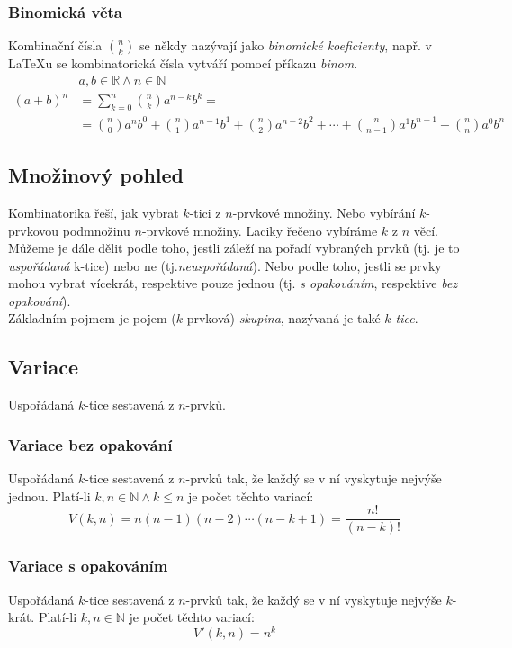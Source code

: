 \documentclass[12pt]{article}
\begin{document}
\subsubsection{Binomická věta}
\label{sec:binom_veta}
Kombinační čísla $\binom{n}{k}$ se někdy nazývají jako \emph{binomické koeficienty}, např. v \LaTeX u se kombinatorická čísla vytváří pomocí příkazu \emph{binom}.
\begin{align}
&a,b \in \mathbb{R} \land n \in \mathbb{N}&\\
\left( a+ b \right)^n  &= \sum^{n}_{k=0} \binom{n}{k}a^{n-k}b^{k} =\\
&= \binom{n}{0}a^n  b^0 +  \binom{n}{1}a^{n-1}b^{1} +  \binom{n}{2}a^{n-2}b^{2} + \dotsb +  \binom{n}{n-1}a^{1}b^{n-1} +  \binom{n}{n}a^{0}b^{n}
\end{align}
\subsection{Množinový pohled}
Kombinatorika řeší, jak vybrat $k$-tici z $n$-prvkové množiny. Nebo vybírání $k$-prvkovou podmnožinu $n$-prvkové množiny. Laciky řečeno vybíráme $k$ z $n$ věcí.\\
Můžeme je dále dělit podle toho, jestli záleží na pořadí vybraných prvků (tj. je to \emph{uspořádaná} k-tice) nebo ne (tj.\emph{neuspořádaná}). Nebo podle toho, jestli se prvky mohou vybrat vícekrát, respektive pouze jednou (tj. \emph{s opakováním}, respektive \emph{bez opakování}).\\
Základním pojmem je pojem ($k$-prvková) \emph{skupina}, nazývaná je také \emph{$k$-tice}.

\subsection{Variace}
Uspořádaná $k$-tice sestavená z $n$-prvků.
\subsubsection{Variace bez opakování}
Uspořádaná $k$-tice sestavená z $n$-prvků tak, že každý se v ní vyskytuje nejvýše jednou. Platí-li $k,n \in \mathbb{N} \land k \leq n$ je počet těchto variací:
\begin{equation}
V(k,n) = n (n-1)(n-2) \dotsm (n-k+1) = \frac{n!}{\left( n-k \right)!}
\end{equation}
\subsubsection{Variace s opakováním}
Uspořádaná $k$-tice sestavená z $n$-prvků tak, že každý se v ní vyskytuje nejvýše $k$-krát. Platí-li $k,n \in \mathbb{N}$ je počet těchto variací:
\begin{equation}
V'(k,n) = n^k
\end{equation}
\end{document}
